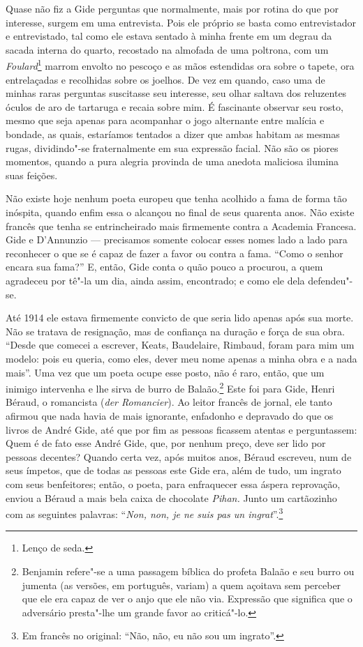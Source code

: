 Quase não fiz a Gide perguntas que normalmente, mais por rotina do que
por interesse, surgem em uma entrevista. Pois ele próprio se basta como entrevistador e entrevistado, tal como ele estava
sentado à minha frente em um degrau da sacada interna do quarto,
recostado na almofada de uma poltrona, com um \emph{Foulard}\footnote{Lenço de seda. \versal{[N. T.]}} marrom envolto no pescoço e as mãos estendidas ora
sobre o tapete, ora entrelaçadas e recolhidas sobre os joelhos.
De vez em
quando, caso uma de minhas raras perguntas suscitasse seu interesse, seu
olhar saltava dos reluzentes óculos de aro de tartaruga e recaia sobre
mim. É fascinante observar seu rosto, mesmo que seja apenas para
acompanhar o jogo alternante entre malícia e bondade, as quais,
estaríamos tentados a dizer que ambas habitam as mesmas rugas,
dividindo"-se fraternalmente em sua expressão facial. Não são os piores
momentos, quando a pura alegria provinda de uma anedota maliciosa
ilumina suas feições.

Não existe hoje nenhum poeta europeu que tenha acolhido a fama de forma
tão inóspita, quando enfim essa o alcançou no final de seus quarenta anos.
Não existe francês que tenha se entrincheirado mais firmemente contra a
Academia Francesa. Gide e D'Annunzio --- precisamos somente colocar esses
nomes lado a lado para reconhecer o que se é capaz de fazer a favor ou
contra a fama. ``Como o senhor encara sua fama?'' E, então, Gide conta o
quão pouco a procurou, a quem agradeceu por tê"-la um dia, ainda assim,
encontrado; e como ele dela defendeu"-se.

Até 1914 ele estava firmemente convicto de que seria lido apenas após
sua morte. Não se tratava de resignação, mas de confiança na duração e
força de sua obra. ``Desde que comecei a escrever, Keats, Baudelaire,
Rimbaud, foram para mim um modelo: pois eu queria, como eles, dever meu
nome apenas a minha obra e a nada mais''. Uma vez que um poeta ocupe
esse posto, não é raro, então, que um inimigo intervenha e lhe sirva de
burro de Balaão.\footnote{Benjamin refere"-se a uma passagem bíblica do profeta Balaão e seu burro ou jumenta (as versões, em português, variam) a quem açoitava sem perceber que ele era capaz de ver o anjo que ele não via. Expressão que significa que o adversário
  presta"-lhe um grande favor ao criticá"-lo. \versal{[N. T.]}} Este foi para Gide, Henri Béraud, o romancista (\emph{der
Romancier}). Ao leitor francês de jornal, ele tanto afirmou que nada
havia de mais ignorante, enfadonho e depravado do que os livros de André
Gide, até que por fim as pessoas ficassem atentas e perguntassem: Quem é
de fato esse André Gide, que, por nenhum preço, deve ser lido por
pessoas decentes? Quando certa vez, após muitos anos, Béraud escreveu,
num de seus ímpetos, que de todas as pessoas este Gide era, além de
tudo, um ingrato com seus benfeitores; então, o poeta, para enfraquecer
essa áspera reprovação, enviou a Béraud a mais bela caixa de chocolate
\emph{Pihan.} Junto um cartãozinho com as seguintes palavras:
``\emph{Non, non, je ne suis pas un ingrat}''.\footnote{Em francês no original: ``Não,
  não, eu não sou um ingrato''. \versal{[N. T.]}}

